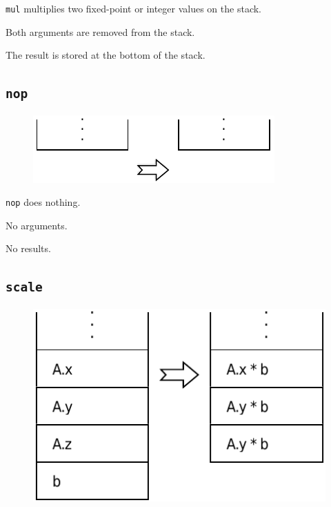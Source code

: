 			\texttt{mul} multiplies two fixed-point or integer values on the
			stack.
			
			Both arguments are removed from the stack.
			
			The result is stored at the bottom of the stack.
	
	\qquad
	
	\subsection*{\texttt{nop}}
	
		\begin{figure}
			\begin{flushright}
				\includegraphics[width=\linewidth]{figure/pdf/i_nop} 
			\end{flushright}
		\end{figure}
	
			\texttt{nop} does nothing.
			
			No arguments.
			
			No results.
	
	\qquad
	
	\subsection*{\texttt{scale}}
	
		\begin{figure}
			\begin{flushright}
				\includegraphics[width=\linewidth]{figure/pdf/i_scale} 
			\end{flushright}
		\end{figure}
	
